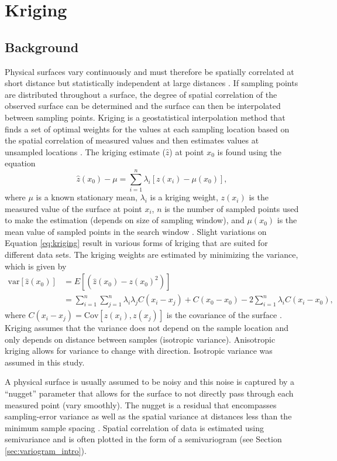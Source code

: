 \documentclass[12pt]{article}
\begin{document}
\section{Kriging}

\subsection{Background}

Physical surfaces vary continuously and must therefore be spatially correlated at short distance but statistically independent at large distances \citep{Davis1986}. If sampling points are distributed throughout a surface, the degree of spatial correlation of the observed surface can be determined and the surface can then be interpolated between sampling points. Kriging is a geostatistical interpolation method that finds a set of optimal weights for the values at each sampling location based on the spatial correlation of measured values and then estimates values at unsampled locations \citep{Davis1986, Li2014}. The kriging estimate ($\hat{z}$) at point $x_0$ is found using the equation
\begin{equation}
\label{eq:kriging}
\hat{z}(x_0) - \mu = \sum_{i=1}^{n} \lambda_i [z(x_i)-\mu(x_0)],
\end{equation}
where $\mu$ is a known stationary mean, $\lambda_i$ is a kriging weight, $z(x_i)$ is the measured value of the surface at point $x_i$, $n$ is the number of sampled points used to make the estimation (depends on size of sampling window), and $\mu(x_0)$ is the mean value of sampled points in the search window \cite{Wackernagel2003, Li2008}. Slight variations on Equation \ref{eq:kriging} result in various forms of kriging that are suited for different data sets. The kriging weights are estimated by minimizing the variance, which is given by
\begin{align}
\mathrm{var}[\hat{z}(x_0)] &= E[(\hat{z}(x_0)-z(x_0)^2)]\\
&=\sum_{i=1}^{n}\sum_{j=1}^{n}\lambda_i \lambda_j C(x_i-x_j)+C(x_0-x_0)-2 \sum_{i=1}^{n} \lambda_i C(x_i-x_0),
\end{align}
where $C(x_i-x_j) = \mathrm{Cov}[z(x_i),z(x_j)]$ is the covariance of the surface \citep{Li2008}. Kriging assumes that the variance does not depend on the sample location and only depends on distance between samples (isotropic variance).  Anisotropic kriging allows for variance to change with direction. Isotropic variance was assumed in this study.

A physical surface is usually assumed to be noisy and this noise is captured by a ``nugget'' parameter that allows for the surface to not directly pass through each measured point (vary smoothly). The nugget is a residual that encompasses sampling-error variance as well as the spatial variance at distances less than the minimum sample spacing \citep{Li2008}. Spatial correlation of data is estimated using semivariance and is often plotted in the form of a semivariogram (see Section \ref{sec:variogram_intro}).  
\end{document}
